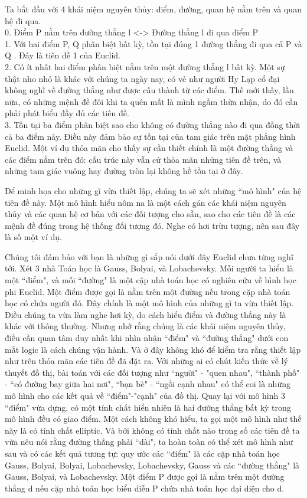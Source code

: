 \begin{multicols}{2}
	Ta bắt đầu với 4 khái niệm nguyên thủy: điểm, đường, quan hệ nằm trên và quan hệ đi qua.\\
	0. Điểm P nằm trên đường thẳng l <-> Đường thẳng l đi qua điểm P \\
	1. Với hai điểm P, Q phân biệt bất kỳ, tồn tại đúng 1 đường thẳng đi qua cả P và Q . Đây là tiên đề 1 của Euclid. \\
	2. Có ít nhất hai điểm phân biệt nằm trên một đường thẳng l bất kỳ. Một sự thật nho nhỏ là khác với chúng ta ngày nay, có vẻ như người Hy Lạp cổ đại không nghĩ về đường thẳng như được cấu thành từ các điểm. Thế mới thấy, lần nữa, có những mệnh đề đôi khi ta quên mất là mình ngầm thừa nhận, do đó cần phải phát biểu đầy đủ các tiên đề. \\
	3. Tồn tại ba điểm phân biệt sao cho không có đường thẳng nào đi qua đồng thời cả ba điểm này. Điều này đảm bảo sự tồn tại của tam giác trên mặt phẳng hình Euclid. Một ví dụ thỏa mãn cho thấy sự cần thiết chính là một đường thẳng và các điểm nằm trên đó: cấu trúc này vẫn cứ thỏa mãn những tiên đề trên, và những tam giác vuông hay đường tròn lại không hề tồn tại ở đây.
	
	Để minh họa cho những gì vừa thiết lập, chúng ta sẽ xét những ``mô hình" của hệ tiên đề này. Một mô hình hiểu nôm na là một cách gán các khái niệm nguyên thủy và các quan hệ cơ bản với các đối tượng cho sẵn, sao cho các tiên đề là các mệnh đề đúng trong hệ thống đối tượng đó. Nghe có hơi trừu tượng, nên sau đây là số một ví dụ.
	
	Chúng tôi đảm bảo với bạn là những gì sắp nói dưới đây Euclid chưa từng nghĩ tới. Xét 3 nhà Toán học là Gauss, Bolyai, và Lobachevsky. Mỗi người ta hiểu là một ``điểm", và mỗi ``đường" là một cặp nhà toán học có nghiên cứu về hình học phi Euclid. Một điểm được gọi là nằm trên một đường nếu trong cặp nhà toán học có chứa người đó. Đây chính là một mô hình của những gì ta vừa thiết lập.
	Điều chúng ta vừa làm nghe hơi kỳ, do cách hiểu điểm và đường thẳng này là khác với thông thường. Nhưng nhớ rằng chúng là các khái niệm nguyên thủy, điều cần quan tâm duy nhất khi nhìn nhận ``điểm" và ``đường thẳng" dưới con mắt logic là cách chúng vận hành. Và ở đây không khó để kiểm tra rằng thiết lập như trên thỏa mãn các tiên đề đã đặt ra. Với những ai có chút kiến thức về lý thuyết đồ thị, bài toán với các đối tượng như ``người" - "quen nhau", ``thành phố" - ``có đường bay giữa hai nơi", ``bạn bè" - ``ngồi cạnh nhau" có thể coi là những mô hình cho các kết quả về ``điểm"-"cạnh" của đồ thị. 
	Quay lại với mô hình 3 ``điểm" vừa dựng, có một tính chất hiển nhiên là hai đường thẳng bất kỳ trong mô hình đều có giao điểm. Một cách không khó hiểu, ta gọi một mô hình như thế này là có tính chất elliptic.
	Và bởi không có tính chất nào trong số các tiên đề ta vừa nêu nói rằng đường thẳng phải ``dài", ta hoàn toàn có thể xét mô hình như sau và có các kết quả tương tự: quy ước các ``điểm" là các cặp nhà toán học {Gauss, Bolyai}, {Bolyai, Lobachevsky}, {Lobachevsky, Gauss} và các ``đường thẳng" là Gauss, Bolyai, và Lobachevsky. Một điểm P được gọi là nằm trên một đường thẳng d nếu cặp nhà toán học biểu diễn P chứa nhà toán học đại diện cho d. 
	

\end{multicols}
